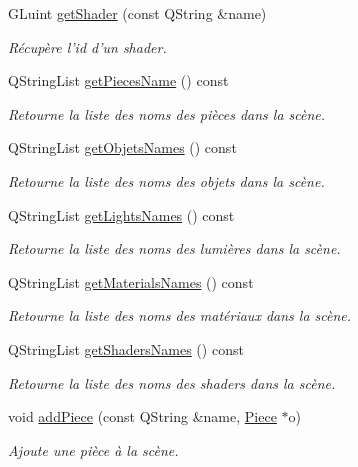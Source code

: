 \begin{DoxyCompactItemize}
G\+Luint \hyperlink{class_scene_a002dee3b17da628be382679c99d78c8f}{get\+Shader} (const Q\+String \&name)
\begin{DoxyCompactList}\small\item\em Récupère l'id d'un shader. \end{DoxyCompactList}\item 
Q\+String\+List \hyperlink{class_scene_a2ea5207a5d9ec6e4081f12896b01d9d5}{get\+Pieces\+Name} () const 
\begin{DoxyCompactList}\small\item\em Retourne la liste des noms des pièces dans la scène. \end{DoxyCompactList}\item 
Q\+String\+List \hyperlink{class_scene_a8ad3eeaf9d9968a31c64a257230cfc22}{get\+Objets\+Names} () const 
\begin{DoxyCompactList}\small\item\em Retourne la liste des noms des objets dans la scène. \end{DoxyCompactList}\item 
Q\+String\+List \hyperlink{class_scene_a215d616b6132f30a6bfc66ea4a3cfb95}{get\+Lights\+Names} () const 
\begin{DoxyCompactList}\small\item\em Retourne la liste des noms des lumières dans la scène. \end{DoxyCompactList}\item 
Q\+String\+List \hyperlink{class_scene_a481bf791889936bf3521c849bc4c7c2f}{get\+Materials\+Names} () const 
\begin{DoxyCompactList}\small\item\em Retourne la liste des noms des matériaux dans la scène. \end{DoxyCompactList}\item 
Q\+String\+List \hyperlink{class_scene_ae8045c3444b367c070988b30d69e5a36}{get\+Shaders\+Names} () const 
\begin{DoxyCompactList}\small\item\em Retourne la liste des noms des shaders dans la scène. \end{DoxyCompactList}\item 
void \hyperlink{class_scene_a6c40a38ef472e73ddee697f813b8e587}{add\+Piece} (const Q\+String \&name, \hyperlink{class_piece}{Piece} $\ast$o)
\begin{DoxyCompactList}\small\item\em Ajoute une pièce à la scène. \end{DoxyCompactList}\item 

\end{DoxyCompactItemize}
